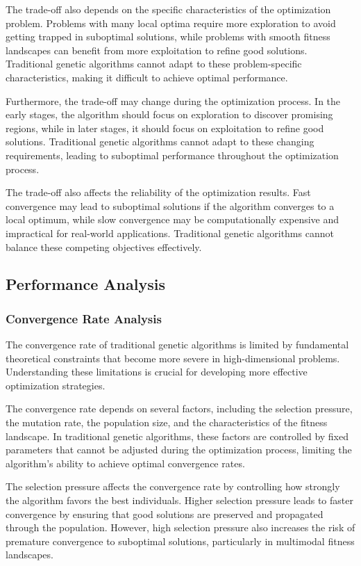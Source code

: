 \documentclass[12pt,a4paper]{article}
\begin{document}
The trade-off also depends on the specific characteristics of the optimization problem. Problems with many local optima require more exploration to avoid getting trapped in suboptimal solutions, while problems with smooth fitness landscapes can benefit from more exploitation to refine good solutions. Traditional genetic algorithms cannot adapt to these problem-specific characteristics, making it difficult to achieve optimal performance.

Furthermore, the trade-off may change during the optimization process. In the early stages, the algorithm should focus on exploration to discover promising regions, while in later stages, it should focus on exploitation to refine good solutions. Traditional genetic algorithms cannot adapt to these changing requirements, leading to suboptimal performance throughout the optimization process.

The trade-off also affects the reliability of the optimization results. Fast convergence may lead to suboptimal solutions if the algorithm converges to a local optimum, while slow convergence may be computationally expensive and impractical for real-world applications. Traditional genetic algorithms cannot balance these competing objectives effectively.

\subsection{Performance Analysis}

\subsubsection{Convergence Rate Analysis}

The convergence rate of traditional genetic algorithms is limited by fundamental theoretical constraints that become more severe in high-dimensional problems. Understanding these limitations is crucial for developing more effective optimization strategies.

The convergence rate depends on several factors, including the selection pressure, the mutation rate, the population size, and the characteristics of the fitness landscape. In traditional genetic algorithms, these factors are controlled by fixed parameters that cannot be adjusted during the optimization process, limiting the algorithm's ability to achieve optimal convergence rates.

The selection pressure affects the convergence rate by controlling how strongly the algorithm favors the best individuals. Higher selection pressure leads to faster convergence by ensuring that good solutions are preserved and propagated through the population. However, high selection pressure also increases the risk of premature convergence to suboptimal solutions, particularly in multimodal fitness landscapes.
\end{document}
